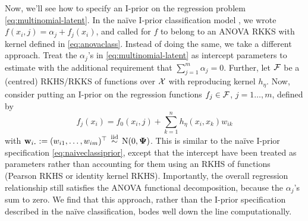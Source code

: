 Now, we'll see how to specify an I-prior on the regression problem \cref{eq:multinomial-latent}.
In the naïve I-prior classification model , we wrote $f(x_i,j) = \alpha_j + f_j(x_i)$, and called for $f$ to belong to an ANOVA RKKS with kernel defined in \cref{eq:anovaclass}.
Instead of doing the same, we take a different approach.
Treat the $\alpha_j$'s in \cref{eq:multinomial-latent} as intercept parameters to estimate with the additional requirement that $\sum_{j=1}^m \alpha_j = 0$.
Further, let ${\mathcal F}$ be a (centred) RKHS/RKKS of functions over ${\mathcal X}$ with reproducing kernel $h_\eta$.
Now, consider putting an I-prior on the regression functions $f_j \in {\mathcal F}$, $j=1\dots,m$, defined by
\[
  f_j(x_i) = f_0(x_i,j) + \sum_{k=1}^n h_\eta(x_i,x_k)w_{ik}
\]
with $\bw_{i \bigcdot} := (w_{i1},\dots,w_{im})^\top \iid \N(0,\bPsi)$.
This is similar to the naïve I-prior specification \cref{eq:naiveclassiprior}, except that the intercept  have been treated as parameters rather than accounting for them using an RKHS of functions (Pearson RKHS or identity kernel RKHS).
Importantly, the overall regression relationship still satisfies the ANOVA functional decomposition, because the $\alpha_j$'s sum to zero.
We find that this approach, rather than the I-prior specification described in the naïve classification, bodes well down the line computationally.

